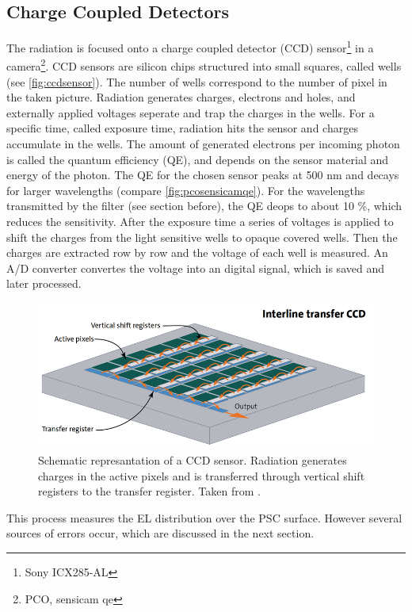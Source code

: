 \subsection{Charge Coupled Detectors}
The radiation is focused onto a charge coupled detector (CCD) sensor\footnote{Sony ICX285-AL} in a camera\footnote{PCO, sensicam qe}. CCD sensors are silicon chips structured into small squares, called wells \cite{SchnellCCD1993}(see \autoref{fig:ccdsensor}). The number of wells correspond to the number of pixel in the taken picture. Radiation generates charges, electrons and holes, and externally applied voltages seperate and trap the charges in the wells. For a specific time, called exposure time, radiation hits the sensor and charges accumulate in the wells. The amount of generated electrons per incoming photon is called the quantum efficiency (QE), and depends on the sensor material and energy of the photon. The QE for the chosen sensor peaks at 500 nm and decays for larger wavelengths (compare \autoref{fig:pcosensicamqe}). For the wavelengths transmitted by the filter (see section before), the QE deops to about 10 \%, which reduces the sensitivity. After the exposure time a series of voltages is applied to shift the charges from the light sensitive wells to opaque covered wells. Then the charges are extracted row by row and the voltage of each well is measured. An A/D converter convertes the voltage into an digital signal, which is saved and later processed.
\begin{figure}
	\centering
	\includegraphics[width=\linewidth]{Images/ExperimentalSetup/ccd-sensor-interline-transfer-en}
	\caption{Schematic represantation of a CCD sensor. Radiation generates charges in the active pixels and is transferred through vertical shift registers to the transfer register. Taken from \cite{StemmerCCD}.}
	\label{fig:ccdsensor}
\end{figure}

This process measures the EL distribution over the PSC surface. However several sources of errors occur, which are discussed in the next section.

